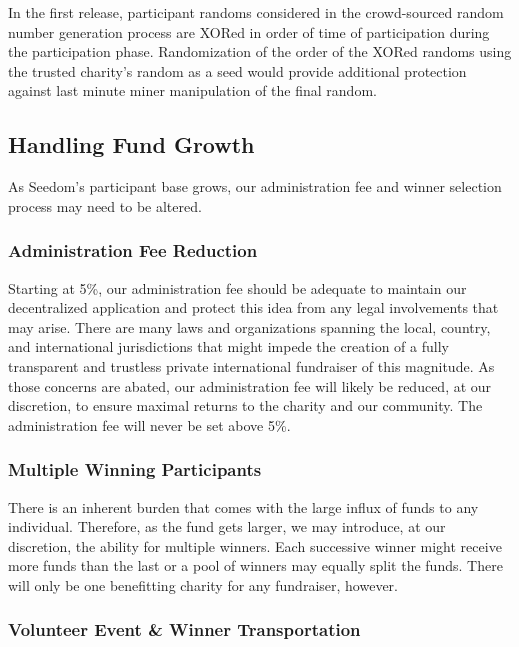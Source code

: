 \documentclass[11pt]{article}
\begin{document}
In the first release, participant randoms considered in the crowd-sourced random number generation process are XORed in order of time of participation during the participation phase. Randomization of the order of the XORed randoms using the trusted charity's random as a seed would provide additional protection against last minute miner manipulation of the final random.

\subsection{Handling Fund Growth}

As Seedom's participant base grows, our administration fee and winner selection process may need to be altered.

\subsubsection{Administration Fee Reduction}

Starting at 5\%, our administration fee should be adequate to maintain our decentralized application and protect this idea from any legal involvements that may arise. There are many laws and organizations spanning the local, country, and international jurisdictions that might impede the creation of a fully transparent and trustless private international fundraiser of this magnitude. As those concerns are abated, our administration fee will likely be reduced, at our discretion, to ensure maximal returns to the charity and our community. The administration fee will never be set above 5\%.

\subsubsection{Multiple Winning Participants}

There is an inherent burden that comes with the large influx of funds to any individual. Therefore, as the fund gets larger, we may introduce, at our discretion, the ability for multiple winners. Each successive winner might receive more funds than the last or a pool of winners may equally split the funds. There will only be one benefitting charity for any fundraiser, however.

\subsubsection{Volunteer Event \& Winner Transportation}
\end{document}
